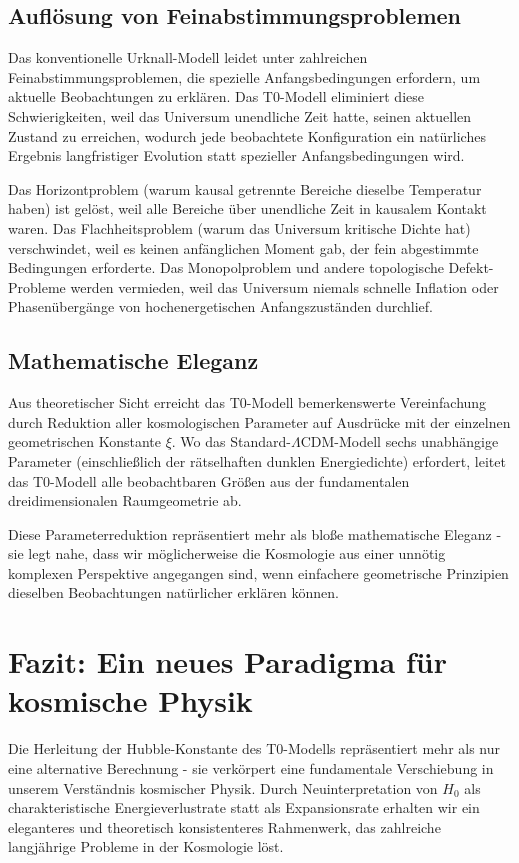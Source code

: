 \documentclass[12pt,a4paper]{article}
\begin{document}
	\subsection{Auflösung von Feinabstimmungsproblemen}
	
	Das konventionelle Urknall-Modell leidet unter zahlreichen Feinabstimmungsproblemen, die spezielle Anfangsbedingungen erfordern, um aktuelle Beobachtungen zu erklären. Das T0-Modell eliminiert diese Schwierigkeiten, weil das Universum unendliche Zeit hatte, seinen aktuellen Zustand zu erreichen, wodurch jede beobachtete Konfiguration ein natürliches Ergebnis langfristiger Evolution statt spezieller Anfangsbedingungen wird.
	
	Das Horizontproblem (warum kausal getrennte Bereiche dieselbe Temperatur haben) ist gelöst, weil alle Bereiche über unendliche Zeit in kausalem Kontakt waren. Das Flachheitsproblem (warum das Universum kritische Dichte hat) verschwindet, weil es keinen anfänglichen Moment gab, der fein abgestimmte Bedingungen erforderte. Das Monopolproblem und andere topologische Defekt-Probleme werden vermieden, weil das Universum niemals schnelle Inflation oder Phasenübergänge von hochenergetischen Anfangszuständen durchlief.
	
	\subsection{Mathematische Eleganz}
	
	Aus theoretischer Sicht erreicht das T0-Modell bemerkenswerte Vereinfachung durch Reduktion aller kosmologischen Parameter auf Ausdrücke mit der einzelnen geometrischen Konstante $\xi$. Wo das Standard-$\Lambda$CDM-Modell sechs unabhängige Parameter (einschließlich der rätselhaften dunklen Energiedichte) erfordert, leitet das T0-Modell alle beobachtbaren Größen aus der fundamentalen dreidimensionalen Raumgeometrie ab.
	
	Diese Parameterreduktion repräsentiert mehr als bloße mathematische Eleganz - sie legt nahe, dass wir möglicherweise die Kosmologie aus einer unnötig komplexen Perspektive angegangen sind, wenn einfachere geometrische Prinzipien dieselben Beobachtungen natürlicher erklären können.
	

	\section{Fazit: Ein neues Paradigma für kosmische Physik}
	
	Die Herleitung der Hubble-Konstante des T0-Modells repräsentiert mehr als nur eine alternative Berechnung - sie verkörpert eine fundamentale Verschiebung in unserem Verständnis kosmischer Physik. Durch Neuinterpretation von $H_0$ als charakteristische Energieverlustrate statt als Expansionsrate erhalten wir ein eleganteres und theoretisch konsistenteres Rahmenwerk, das zahlreiche langjährige Probleme in der Kosmologie löst.
	
\end{document}

